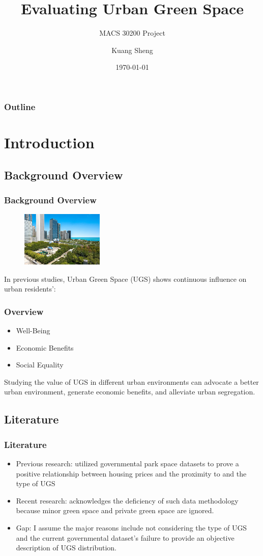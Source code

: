 \documentclass{beamer}
\title{Evaluating Urban Green Space}
\subtitle{MACS 30200 Project}
\author{Kuang Sheng}
\institute{University of Chicago}
\date{\today}
\begin{document}
\begin{frame}
\titlepage
\end{frame}

\begin{frame}
\frametitle{Outline}
\tableofcontents
\end{frame}

\section{Introduction}
\subsection{Background Overview}

\begin{frame}
\frametitle{Background Overview}
\begin{figure}[h]
  \centering
  \includegraphics[width=0.35\textwidth]{Visual/MPark.jpg}
\end{figure}
In previous studies, Urban Green Space (UGS) shows continuous influence on urban residents’: 
\frametitle{Overview}
\begin{itemize}
    \item Well-Being
    \item Economic Benefits
    \item Social Equality
\end{itemize}
Studying the value of UGS in different urban environments can advocate a better urban environment, generate economic benefits, and alleviate urban segregation.
\end{frame}

\subsection{Literature}

\begin{frame}
\frametitle{Literature}
\begin{itemize}
    \item Previous research: utilized governmental park space datasets to prove a positive relationship between housing prices and the proximity to and the type of UGS
    \item Recent research: acknowledges the deficiency of such data methodology because \alert{minor green space} and \alert{private green space} are ignored.
    \item Gap: I assume the major reasons include not considering the type of UGS and the current governmental dataset's failure to provide an objective description of UGS distribution.
\end{itemize}
\end{frame}
\end{document}
